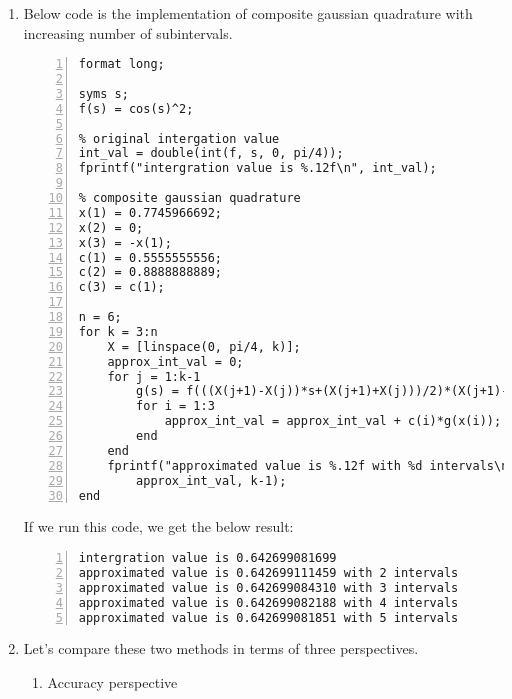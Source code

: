 \documentclass{article}
\begin{document}
\begin{enumerate}
\begin{enumerate}[wide=10pt]
\begin{lstlisting}[frame=single, numbers=left, style=Matlab-editor]
approx_int_vals = zeros(1, 5);
for n = 2:5
    for i = 1:n
        approx_int_vals(n) = approx_int_vals(n) + c(n,i)*g(x(n,i));
    end
end

for n = 2:5
    fprintf("approximated value is %.12f with order n=%d\n", ...
        approx_int_vals(n), n)
end
        \end{lstlisting} If we run this code, we get the below result: \begin{lstlisting}[frame=single, numbers=left, style=Matlab-editor]
intergration value is 0.642699081699
approximated value is 0.642317235049 with order n=2
approximated value is 0.642701112122 with order n=3
approximated value is 0.642699075999 with order n=4
approximated value is 0.642699081680 with order n=5
        \end{lstlisting}
        \item Below code is the implementation of composite gaussian quadrature with increasing number of subintervals. \begin{lstlisting}[frame=single, numbers=left, style=Matlab-editor]
format long;

syms s;
f(s) = cos(s)^2;

% original intergation value
int_val = double(int(f, s, 0, pi/4));
fprintf("intergration value is %.12f\n", int_val);

% composite gaussian quadrature
x(1) = 0.7745966692;
x(2) = 0;
x(3) = -x(1);
c(1) = 0.5555555556;
c(2) = 0.8888888889;
c(3) = c(1);

n = 6;
for k = 3:n
    X = [linspace(0, pi/4, k)];
    approx_int_val = 0;
    for j = 1:k-1
        g(s) = f(((X(j+1)-X(j))*s+(X(j+1)+X(j)))/2)*(X(j+1)-X(j))/2;
        for i = 1:3
            approx_int_val = approx_int_val + c(i)*g(x(i));
        end
    end
    fprintf("approximated value is %.12f with %d intervals\n", ...
        approx_int_val, k-1);
end
        \end{lstlisting} If we run this code, we get the below result: \begin{lstlisting}[frame=single, numbers=left, style=Matlab-editor]
intergration value is 0.642699081699
approximated value is 0.642699111459 with 2 intervals
approximated value is 0.642699084310 with 3 intervals
approximated value is 0.642699082188 with 4 intervals
approximated value is 0.642699081851 with 5 intervals
        \end{lstlisting}
        \item Let’s compare these two methods in terms of three perspectives. \begin{enumerate}[wide=30pt]
            \item Accuracy perspective


\end{enumerate}
\end{enumerate}
\end{enumerate}
\end{document}

